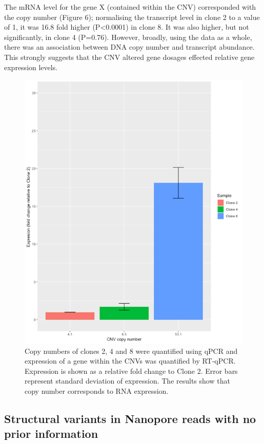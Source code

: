 \documentclass{article}
\begin{document}
The mRNA level for the gene X (contained within the CNV) corresponded with the copy number (Figure 6); normalising the transcript level in clone 2 to a value of 1, it was 16.8 fold higher (P<0.0001) in clone 8. It was also higher, but not significantly, in clone 4 (P=0.76). However, broadly, using the data as a whole, there was an association between DNA copy number and transcript abundance. This strongly suggests that the CNV altered gene dosages  effected relative gene expression levels.

\begin{figure}[h!]
\centering
\includegraphics[width=\textwidth{}]{Chapter_2/DNA RNA.png}
\caption{  Copy numbers of clones 2, 4 and 8 were quantified using qPCR and expression of a gene within the CNVs was quantified by RT-qPCR. Expression is shown as a relative fold change to Clone 2. Error bars represent standard deviation of expression. The results show that copy number corresponds to RNA expression.}
\label{fig:Clone_4_8_reads}
\end{figure}


\subsection{Structural variants in Nanopore reads with no prior information}
\end{document}
